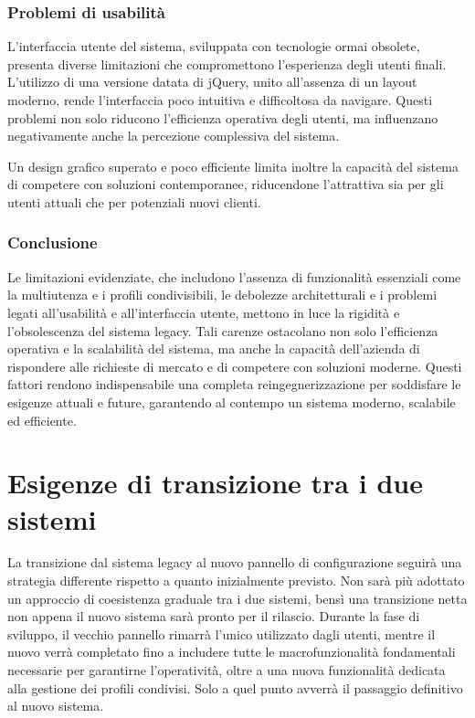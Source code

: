 \subsubsection{Problemi di usabilità}
L'interfaccia utente del sistema, sviluppata con tecnologie ormai obsolete, presenta diverse limitazioni che compromettono l’esperienza degli utenti finali. L’utilizzo di una versione datata di jQuery, unito all’assenza di un layout moderno, rende l’interfaccia poco intuitiva e difficoltosa da navigare. Questi problemi non solo riducono l’efficienza operativa degli utenti, ma influenzano negativamente anche la percezione complessiva del sistema.

Un design grafico superato e poco efficiente limita inoltre la capacità del sistema di competere con soluzioni contemporanee, riducendone l’attrattiva sia per gli utenti attuali che per potenziali nuovi clienti.

\subsubsection{Conclusione}
Le limitazioni evidenziate, che includono l’assenza di funzionalità essenziali come la multiutenza e i profili condivisibili, le debolezze architetturali e i problemi legati all’usabilità e all’interfaccia utente, mettono in luce la rigidità e l'obsolescenza del sistema legacy. Tali carenze ostacolano non solo l'efficienza operativa e la scalabilità del sistema, ma anche la capacità dell'azienda di rispondere alle richieste di mercato e di competere con soluzioni moderne. Questi fattori rendono indispensabile una completa reingegnerizzazione per soddisfare le esigenze attuali e future, garantendo al contempo un sistema moderno, scalabile ed efficiente.

\section{Esigenze di transizione tra i due sistemi}
La transizione dal sistema legacy al nuovo pannello di configurazione seguirà una strategia differente rispetto a quanto inizialmente previsto. Non sarà più adottato un approccio di coesistenza graduale tra i due sistemi, bensì una transizione netta non appena il nuovo sistema sarà pronto per il rilascio. Durante la fase di sviluppo, il vecchio pannello rimarrà l’unico utilizzato dagli utenti, mentre il nuovo verrà completato fino a includere tutte le macrofunzionalità fondamentali necessarie per garantirne l’operatività, oltre a una nuova funzionalità dedicata alla gestione dei profili condivisi. Solo a quel punto avverrà il passaggio definitivo al nuovo sistema.

